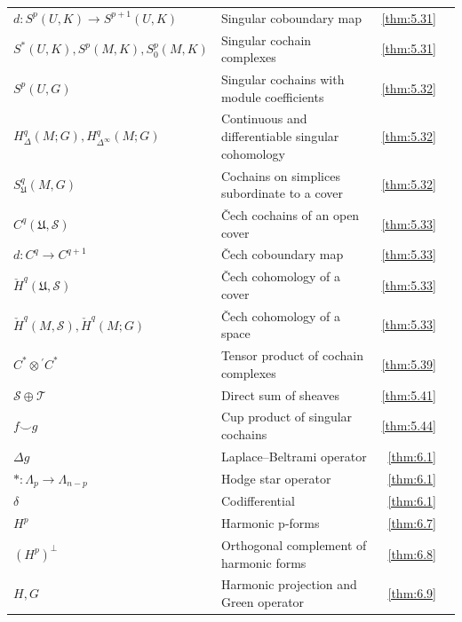 {\begin{longtable}{@{}>{\raggedright\arraybackslash}p{.39\linewidth}>{\raggedright\arraybackslash}p{.39\linewidth}r r@{}}
$d:S^{p}(U,\allowbreak K)\to S^{p+1}(U,\allowbreak K)$ & Singular coboundary map & \ref{thm:5.31} & \pageref{thm:5.31} \\
$S^{*}(U,\allowbreak K),\allowbreak S^{p}(M,\allowbreak K),\allowbreak S_{0}^{p}(M,\allowbreak K)$ & Singular cochain complexes & \ref{thm:5.31} & \pageref{thm:5.31} \\
$S^{p}(U,\allowbreak G)$ & Singular cochains with module coefficients & \ref{thm:5.32} & \pageref{thm:5.32} \\
$H_\Delta^q(M;G),\allowbreak H_{\Delta^\infty}^q(M;G)$ & Continuous and differentiable singular cohomology & \ref{thm:5.32} & \pageref{thm:5.32} \\
$S_{\mathfrak U}^q(M,\allowbreak G)$ & Cochains on simplices subordinate to a cover & \ref{thm:5.32} & \pageref{thm:5.32} \\
$C^q(\mathfrak U,\allowbreak \mathcal S)$ & Čech cochains of an open cover & \ref{thm:5.33} & \pageref{thm:5.33} \\
$d:C^q\to C^{q+1}$ & Čech coboundary map & \ref{thm:5.33} & \pageref{thm:5.33} \\
$\check H^q(\mathfrak U,\allowbreak \mathcal S)$ & Čech cohomology of a cover & \ref{thm:5.33} & \pageref{thm:5.33} \\
$\check H^q(M,\allowbreak \mathcal S),\allowbreak \check H^q(M;G)$ & Čech cohomology of a space & \ref{thm:5.33} & \pageref{thm:5.33} \\
$C^*\otimes {}^{\prime}C^*$ & Tensor product of cochain complexes & \ref{thm:5.39} & \pageref{thm:5.39} \\
$\mathcal S\oplus\mathcal T$ & Direct sum of sheaves & \ref{thm:5.41} & \pageref{thm:5.41} \\
$f\smile g$ & Cup product of singular cochains & \ref{thm:5.44} & \pageref{thm:5.44} \\
$\Delta g$ & Laplace--Beltrami operator & \ref{thm:6.1} & \pageref{thm:6.1} \\
$\ast:\Lambda_p\to\Lambda_{n-p}$ & Hodge star operator & \ref{thm:6.1} & \pageref{thm:6.1} \\
$\delta$ & Codifferential & \ref{thm:6.1} & \pageref{thm:6.1} \\
$H^p$ & Harmonic p-forms & \ref{thm:6.7} & \pageref{thm:6.7} \\
$(H^p)^\perp$ & Orthogonal complement of harmonic forms & \ref{thm:6.8} & \pageref{thm:6.8} \\
$H,\allowbreak G$ & Harmonic projection and Green operator & \ref{thm:6.9} & \pageref{thm:6.9} \\

\end{longtable}}
